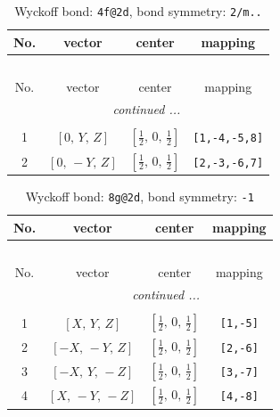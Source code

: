\documentclass[fleqn,8pt]{jsarticle}
\begin{document}
\begin{longtable}{cccc}
\caption{Wyckoff bond: {\tt 4f@2d}, bond symmetry: {\tt 2/m..}}
 \\
 \hline \hline
No. & vector & center & mapping \\ \hline \endfirsthead

\multicolumn{3}{l}{\tablename\ \thetable{}} \\
 \hline \hline
No. & vector & center & mapping \\ \hline \endhead

 \hline \hline
\multicolumn{3}{r}{\footnotesize\it continued ...} \\ \endfoot

 \hline \hline
\multicolumn{3}{r}{} \\ \endlastfoot

1 & $\left[ 0,\, Y,\, Z \right]$ & $\left[ \frac{1}{2},\, 0,\, \frac{1}{2} \right]$ & {\tt [1,-4,-5,8]} \\ \hline
2 & $\left[ 0,\, - Y,\, Z \right]$ & $\left[ \frac{1}{2},\, 0,\, \frac{1}{2} \right]$ & {\tt [2,-3,-6,7]} \\
\end{longtable}
\renewcommand{\arraystretch}{1.2}
\begin{longtable}{cccc}
\caption{Wyckoff bond: {\tt 8g@2d}, bond symmetry: {\tt -1}}
 \\
 \hline \hline
No. & vector & center & mapping \\ \hline \endfirsthead

\multicolumn{3}{l}{\tablename\ \thetable{}} \\
 \hline \hline
No. & vector & center & mapping \\ \hline \endhead

 \hline \hline
\multicolumn{3}{r}{\footnotesize\it continued ...} \\ \endfoot

 \hline \hline
\multicolumn{3}{r}{} \\ \endlastfoot

1 & $\left[ X,\, Y,\, Z \right]$ & $\left[ \frac{1}{2},\, 0,\, \frac{1}{2} \right]$ & {\tt [1,-5]} \\ \hline
2 & $\left[ - X,\, - Y,\, Z \right]$ & $\left[ \frac{1}{2},\, 0,\, \frac{1}{2} \right]$ & {\tt [2,-6]} \\ \hline
3 & $\left[ - X,\, Y,\, - Z \right]$ & $\left[ \frac{1}{2},\, 0,\, \frac{1}{2} \right]$ & {\tt [3,-7]} \\ \hline
4 & $\left[ X,\, - Y,\, - Z \right]$ & $\left[ \frac{1}{2},\, 0,\, \frac{1}{2} \right]$ & {\tt [4,-8]} \\
\end{longtable}
\end{document}
